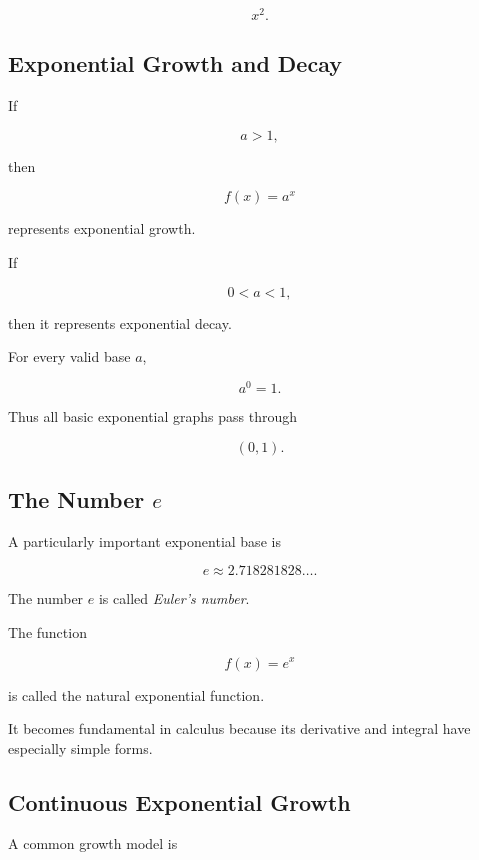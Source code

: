 \[ x^2. \]

\subsection{Exponential Growth and Decay}
\label{subsec:exponential-growth-decay}

If

\[ a>1, \]

then

\[ f(x)=a^x \]

represents exponential growth.

If

\[ 0<a<1, \]

then it represents exponential decay.

For every valid base \(a\),

\[ a^0=1. \]

Thus all basic exponential graphs pass through

\[ (0,1). \]

\subsection{The Number \(e\)}
\label{subsec:number-e}

A particularly important exponential base is

\[ e\approx2.718281828\ldots. \]

The number \(e\) is called \emph{Euler's number}.

The function

\[ f(x)=e^x \]

is called the natural exponential function.

It becomes fundamental in calculus because its derivative and integral have
especially simple forms.

\subsection{Continuous Exponential Growth}
\label{subsec:continuous-exponential-growth}

A common growth model is

